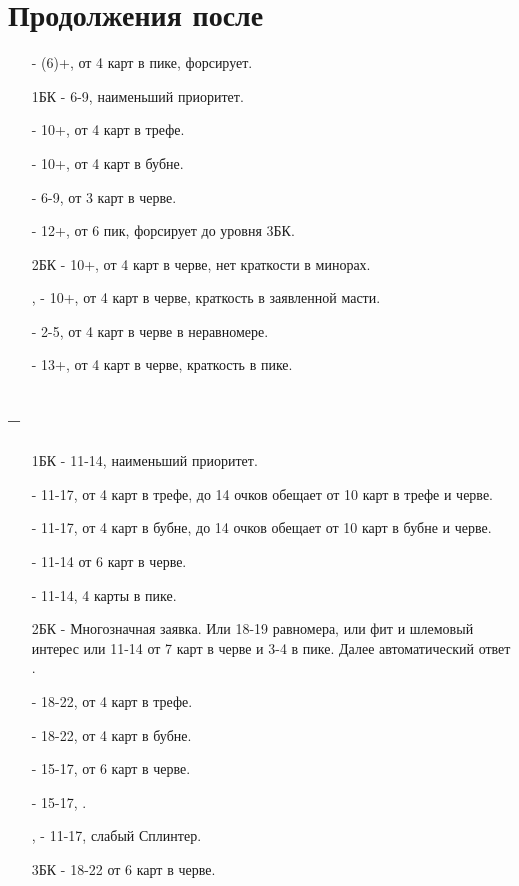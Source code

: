 \documentclass{article}
\begin{document}
\section{Продолжения после }
\begin{enumerate}
    \item[\sp{1}] - (6)+, от 4 карт в пике, форсирует.
    \item[1БК] - 6-9, наименьший приоритет.
    \item[\cl{2}] - 10+, от 4 карт в трефе.
    \item[\di{2}] - 10+, от 4 карт в бубне.
    \item[\he{2}] - 6-9, от 3 карт в черве.
    \item[\sp{2}] - 12+, от 6 пик, форсирует до уровня 3БК.
    \item[2БК] - 10+, от 4 карт в черве, нет краткости в минорах.
    \item[\cl{3}, \di{3}] - 10+, от 4 карт в черве, краткость в заявленной масти.
    \item[\he{3}] - 2-5, от 4 карт в черве в неравномере.
    \item[\sp{3}] - 13+, от 4 карт в черве, краткость в пике.
\end{enumerate}
\subsection{ -- }
\begin{enumerate}
    \item[1БК] - 11-14, наименьший приоритет.
    \item[\cl{2}] - 11-17, от 4 карт в трефе, до 14 очков обещает от 10 карт в трефе и черве. 
    \item[\di{2}] - 11-17, от 4 карт в бубне, до 14 очков обещает от 10 карт в бубне и черве. 
    \item[\he{2}] - 11-14 от 6 карт в черве.
    \item[\sp{2}] - 11-14, 4 карты в пике.
    \item[2БК] - Многозначная заявка. Или 18-19 равномера, или фит и шлемовый интерес или 11-14 от 7 карт в черве и 3-4 в пике. Далее автоматический ответ .
    \item[\cl{3}] - 18-22, от 4 карт в трефе.
    \item[\di{3}] - 18-22, от 4 карт в бубне.
    \item[\he{3}] - 15-17, от 6 карт в черве.
    \item[\sp{3}] - 15-17, .
    \item[\cl{4}, \di{4}] - 11-17, слабый Сплинтер.
    \item[3БК] - 18-22 от 6 карт в черве.
\end{enumerate}
\end{document}
